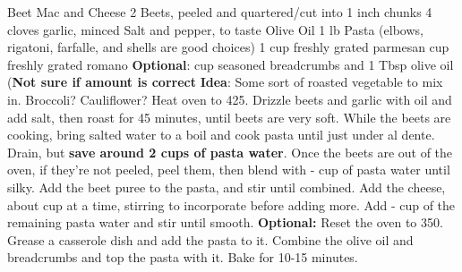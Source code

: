 \documentclass[12pt]{cookbook}
\begin{document}
\begin{recipe}{Beet Mac and Cheese}
\ingredients
{2 Beets, peeled and quartered/cut into 1 inch chunks}
{4 cloves garlic, minced}
{Salt and pepper, to taste}
{Olive Oil}
{1 lb Pasta (elbows, rigatoni, farfalle, and shells are good choices)}
{1 cup freshly grated parmesan}
{ cup freshly grated romano}
{\textbf{Optional}:  cup seasoned breadcrumbs and 1 Tbsp olive oil (\textbf{Not sure if amount is correct}}
{\textbf{Idea}: Some sort of roasted vegetable to mix in. Broccoli? Cauliflower?}
\stopingredients
\preparation
{Heat oven to 425\degree.}
{Drizzle beets and garlic with oil and add salt, then roast for 45 minutes, until beets are very soft.}
{While the beets are cooking, bring salted water to a boil and cook pasta until just under al dente. Drain, but \textbf{save around 2 cups of pasta water}.}
{Once the beets are out of the oven, if they're not peeled, peel them, then blend with - cup of pasta water until silky.}
{Add the beet puree to the pasta, and stir until combined.}
{Add the cheese, about  cup at a time, stirring to incorporate before adding more. Add - cup of the remaining pasta water and stir until smooth.}
{\textbf{Optional:} Reset the oven to 350\degree. Grease a casserole dish and add the pasta to it. Combine the olive oil and breadcrumbs and top the pasta with it. Bake for 10-15 minutes.}
\stopprep
\end{recipe}
\end{document}
